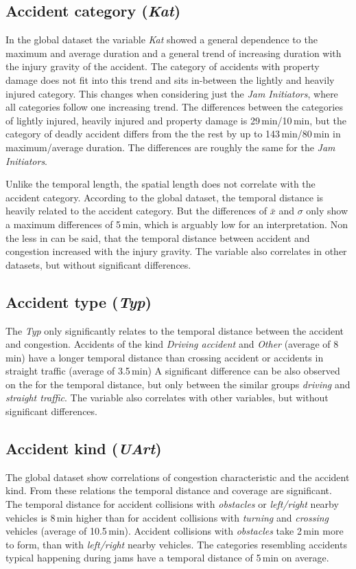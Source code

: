 \subsection{Accident category (\textit{Kat})}
\label{analysis_sum_Kat}
In the global dataset the variable \textit{Kat} showed a general dependence to the maximum and average duration and a general trend of increasing duration with the injury gravity of the accident. The category of accidents with property damage does not fit into this trend and sits in-between the lightly and heavily injured category. This changes when considering just the \textit{Jam Initiators}, where all categories follow one increasing trend. The differences between the categories of lightly injured, heavily injured and property damage is 29\,min/10\,min, but the category of deadly accident differs from the the rest by up to 143\,min/80\,min in maximum/average duration. The differences are roughly the same for the \textit{Jam Initiators}.

Unlike the temporal length, the spatial length does not correlate with the accident category. According to the global dataset, the temporal distance is heavily related to the accident category. But the differences of $\bar{x}$ and $\sigma$ only show a maximum differences of 5\,min, which is arguably low for an interpretation. Non the less in can be said, that the temporal distance between accident and congestion increased with the injury gravity. The variable also correlates in other datasets, but without significant differences.

\subsection{Accident type (\textit{Typ})}
The \textit{Typ} only significantly relates to the temporal distance between the accident and congestion. Accidents of the kind \textit{Driving accident} and \textit{Other} (average of 8\,min) have a longer temporal distance than crossing accident or accidents in straight traffic (average of 3.5\,min) A significant difference can be also observed on the  for the temporal distance, but only between the similar groups \textit{driving} and \textit{straight traffic}. The variable also correlates with other variables, but without significant differences.

\subsection{Accident kind (\textit{UArt})}
The global dataset show correlations of congestion characteristic and the accident kind. From these relations the temporal distance and coverage are significant. The temporal distance for accident collisions with \textit{obstacles} or \textit{left/right} nearby vehicles is 8\,min higher than for accident collisions with \textit{turning} and \textit{crossing} vehicles (average of 10.5\,min). Accident collisions with \textit{obstacles} take 2\,min more to form, than with \textit{left/right} nearby vehicles. The categories resembling accidents typical happening during jams have a temporal distance of 5\,min on average.

